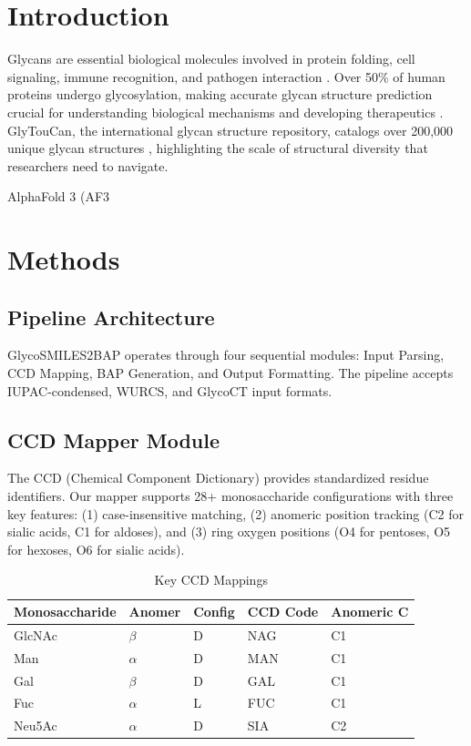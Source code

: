 \documentclass[11pt,a4paper]{article}
\begin{document}
\section{Introduction}

Glycans are essential biological molecules involved in protein folding, cell signaling, immune recognition, and pathogen interaction \citep{varki2017}. Over 50\% of human proteins undergo glycosylation, making accurate glycan structure prediction crucial for understanding biological mechanisms and developing therapeutics \citep{helenius2004}. GlyTouCan, the international glycan structure repository, catalogs over 200,000 unique glycan structures \citep{tiemeyer2016}, highlighting the scale of structural diversity that researchers need to navigate.

AlphaFold 3 (AF3%
\section{Methods}

\subsection{Pipeline Architecture}

GlycoSMILES2BAP operates through four sequential modules: Input Parsing, CCD Mapping, BAP Generation, and Output Formatting. The pipeline accepts IUPAC-condensed, WURCS, and GlycoCT input formats.

\subsection{CCD Mapper Module}

The CCD (Chemical Component Dictionary) provides standardized residue identifiers. Our mapper supports 28+ monosaccharide configurations with three key features: (1) case-insensitive matching, (2) anomeric position tracking (C2 for sialic acids, C1 for aldoses), and (3) ring oxygen positions (O4 for pentoses, O5 for hexoses, O6 for sialic acids).

\begin{table}[h]
\centering
\caption{Key CCD Mappings}
\begin{tabular}{lllll}
\toprule
Monosaccharide & Anomer & Config & CCD Code & Anomeric C \\
\midrule
GlcNAc & $\beta$ & D & NAG & C1 \\
Man & $\alpha$ & D & MAN & C1 \\
Gal & $\beta$ & D & GAL & C1 \\
Fuc & $\alpha$ & L & FUC & C1 \\
Neu5Ac & $\alpha$ & D & SIA & C2 \\
\bottomrule
\end{tabular}
\label{tab:ccd}
\end{table}
\end{document}

